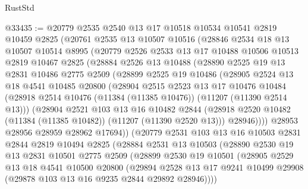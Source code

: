 \begin{lexlean}{RustStd}
\begin{coremodule}
@33435 := @20779
    @2535
    @2540
    @13
    @17
    @10518
    @10534
    @10541
    @2819
    @10459
    @2825
    (@20761
      @2535
      @13
      @10507
      @10516
      (@28846
        @2534
        @18
        @13
        @10507
        @10514
        @8995
        (@20779
          @2526
          @2533
          @13
          @17
          @10488
          @10506
          @10513
          @2819
          @10467
          @2825
          (@28884
            @2526
            @13
            @10488
            (@28890
              @2525
              @19
              @13
              @2831
              @10486
              @2775
              @2509
              (@28899
                @2525
                @19
                @10486
                (@28905
                  @2524
                  @13
                  @18
                  @4541
                  @10485
                  @20800
                  (@28904
                    @2515
                    @2523
                    @13
                    @17
                    @10476
                    @10484
                    (@28918 @2514 @10476 (@11384 (@11385 @10476)) (@11207 (@11390 @2514 @13)))
                    (@28904
                      @2521
                      @103
                      @13
                      @16
                      @10482
                      @2844
                      (@28918 @2520 @10482 (@11384 (@11385 @10482)) (@11207 (@11390 @2520 @13)))
                      @28946))))
              @28953
              @28956
              @28959
              @28962
              @17694))
          (@20779
            @2531
            @103
            @13
            @16
            @10503
            @2831
            @2844
            @2819
            @10494
            @2825
            (@28884
              @2531
              @13
              @10503
              (@28890
                @2530
                @19
                @13
                @2831
                @10501
                @2775
                @2509
                (@28899
                  @2530
                  @19
                  @10501
                  (@28905
                    @2529
                    @13
                    @18
                    @4541
                    @10500
                    @20800
                    (@29894
                      @2528
                      @13
                      @17
                      @9241
                      @10499
                      @29908
                      (@29878 @103 @13 @16 @9235 @2844 @29892 @28946))))

\end{coremodule}
\end{lexlean}
